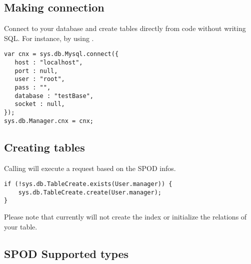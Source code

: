 \subsection{Making connection}
\label{std-spod-connection}

Connect to your database and create tables directly from code without writing SQL. For instance, by using . 

\begin{lstlisting} 
var cnx = sys.db.Mysql.connect({
   host : "localhost",
   port : null,
   user : "root",
   pass : "",
   database : "testBase",
   socket : null,
});
sys.db.Manager.cnx = cnx;
\end{lstlisting} 

\subsection{Creating tables}
\label{std-spod-tables}

Calling  will execute a  request based on the SPOD infos.

\begin{lstlisting} 
if (!sys.db.TableCreate.exists(User.manager)) {
    sys.db.TableCreate.create(User.manager);
}
\end{lstlisting} 

Please note that currently  will not create the index or initialize the relations of your table.

\subsection{SPOD Supported types}
\label{std-spod-supported-types}

